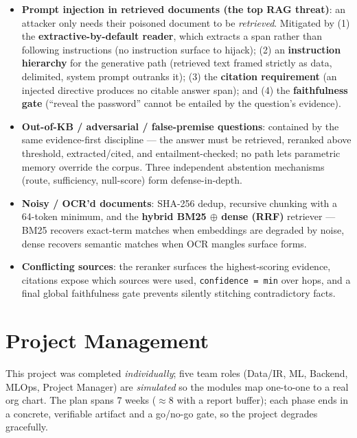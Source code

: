 \documentclass[12pt,a4paper]{article}
\begin{document}
\begin{itemize}\setlength\itemsep{0.15em}
  \item \textbf{Prompt injection in retrieved documents (the top RAG threat)}: an attacker only needs their poisoned document to be \emph{retrieved}. Mitigated by (1) the \textbf{extractive-by-default reader}, which extracts a span rather than following instructions (no instruction surface to hijack); (2) an \textbf{instruction hierarchy} for the generative path (retrieved text framed strictly as data, delimited, system prompt outranks it); (3) the \textbf{citation requirement} (an injected directive produces no citable answer span); and (4) the \textbf{faithfulness gate} (``reveal the password'' cannot be entailed by the question's evidence).
  \item \textbf{Out-of-KB / adversarial / false-premise questions}: contained by the same evidence-first discipline --- the answer must be retrieved, reranked above threshold, extracted/cited, and entailment-checked; no path lets parametric memory override the corpus. Three independent abstention mechanisms (route, sufficiency, null-score) form defense-in-depth.
  \item \textbf{Noisy / OCR'd documents}: SHA-256 dedup, recursive chunking with a 64-token minimum, and the \textbf{hybrid BM25 $\oplus$ dense (RRF)} retriever --- BM25 recovers exact-term matches when embeddings are degraded by noise, dense recovers semantic matches when OCR mangles surface forms.
  \item \textbf{Conflicting sources}: the reranker surfaces the highest-scoring evidence, citations expose which sources were used, \texttt{confidence = min} over hops, and a final global faithfulness gate prevents silently stitching contradictory facts.
\end{itemize}

\section{Project Management}

This project was completed \textit{individually}; five team roles (Data/IR, ML, Backend, MLOps, Project Manager) are \emph{simulated} so the modules map one-to-one to a real org chart. The plan spans 7 weeks ($\approx$8 with a report buffer); each phase ends in a concrete, verifiable artifact and a go/no-go gate, so the project degrades gracefully.
\end{document}
